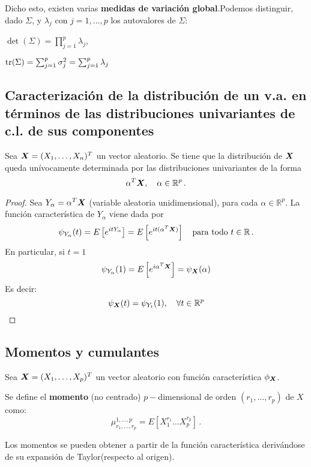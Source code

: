Dicho esto, existen varias \textbf{medidas de variación global}.Podemos distinguir, dado $\Sigma$, y $\lambda_j$ con $j = 1,\dots,p$ los autovalores de $\Sigma$:
\begin{nlist}
\item $\det(\Sigma) =  \prod_{j=1}^p \lambda_j$,
  \item $\operatorname{tr}(\Sigma) = \sum_{j = 1}^p \sigma_j^2 = \sum_{j=1}^p \lambda_j$
\end{nlist}


\subsection{Caracterización de la distribución de un v.a. en términos de las distribuciones univariantes de c.l. de sus componentes}

\begin{nth}
  Sea $\boldsymbol{X} = (X_1,\dots, X_n)^T$ un vector aleatorio. Se tiene que la distribución de $\boldsymbol{X}$ queda unívocamente determinada por las distribuciones univariantes de la forma
  \[
\alpha ^T \boldsymbol{X}, \quad \alpha \in \mathbb R ^p\,.
  \]
\end{nth}
\begin{proof}
  Sea $Y_\alpha = \alpha^T \boldsymbol{X}$ (variable aleatoria unidimensional), para cada $\alpha \in \mathbb R^p$. La función característica de $Y_\alpha$ viene dada por
  \[
  \psi_{Y_\alpha}(t) = E\left[e^{itY_\alpha}\right] = E \left[e^{it(\alpha^T \boldsymbol{X})}\right] \quad \text{para todo } t \in \mathbb R\,.
  \]
  En particular, si $t=1$
  \[
  \psi_{Y_\alpha}(1) = E\left[e^{i\alpha^T \boldsymbol{X}}\right] = \psi_{\boldsymbol{X}} (\alpha)
  \]
  Es decir:
  \[
  \psi_{\boldsymbol{X}}(t) = \psi_{Y_t}(1), \quad \forall t \in \mathbb R ^p
  \]
\end{proof}

\subsection{Momentos y cumulantes}

Sea $\boldsymbol{X}= (X_1,\dots,X_p)^T$ un vector aleatorio con función característica $\phi_{\boldsymbol{X}}$.
\begin{ndef}
  Se define el \textbf{momento} (no centrado) $p-$dimensional de orden $(r_1, \dots, r_p)$ de $X$ como:
  \[
\mu_{r_1,\dots,r_p}^{1,\dots,p} = E \left[ X_1^{r_1} \dots X_p^{r_p}\right]\,.
  \]
\end{ndef}

Los momentos se pueden obtener a partir de la función característica derivándose de su expansión de Taylor(respecto al origen).

